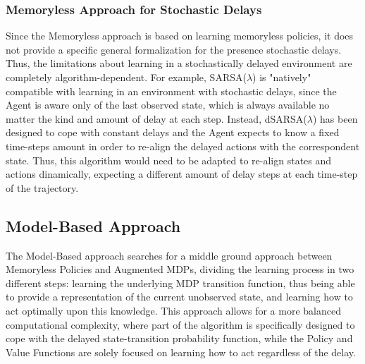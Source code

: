             \subsubsection{Memoryless Approach for Stochastic Delays}
                Since the Memoryless approach is based on learning memoryless policies, it does not provide a specific general formalization for the presence stochastic delays. Thus, the limitations about learning in a stochastically delayed environment are completely algorithm-dependent. For example, SARSA($\lambda$) is "natively" compatible with learning in an environment with stochastic delays, since the Agent is aware only of the last observed state, which is always available no matter the kind and amount of delay at each step. Instead, dSARSA($\lambda$) has been designed to cope with constant delays and the Agent expects to know a fixed time-steps amount in order to re-align the delayed actions with the correspondent state. Thus, this algorithm would need to be adapted to re-align states and actions dinamically, expecting a different amount of delay steps at each time-step of the trajectory. \newline
            
        \newpage
        \subsection{Model-Based Approach}
            
        
            \label{subs:modelbasedapproach}
            The Model-Based approach searches for a middle ground approach between Memoryless Policies and Augmented MDPs, dividing the learning process in two different steps: learning the underlying MDP transition function, thus being able to provide a representation of the current unobserved state, and learning how to act optimally upon this knowledge. This approach allows for a more balanced computational complexity, where part of the algorithm is specifically designed to cope with the delayed state-transition probability function, while the Policy and Value Functions are solely focused on learning how to act regardless of the delay.
            
